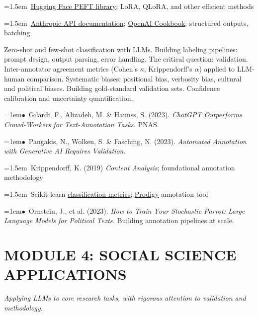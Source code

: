 \documentclass[11pt, a4paper]{article}
\newcommand{\topichead}[1]{%
  \vspace{0.8em}{\large\sffamily\bfseries\textcolor{accent}{#1}}\par\vspace{0.3em}
}
\newcommand{\seclabel}[1]{%
  \vspace{0.5em}{\normalsize\sffamily\bfseries\textcolor{accent}{#1}}\par\vspace{0.2em}
}
\newcommand{\refpaper}[1]{%
  \par\hangindent=1em\hangafter=1\noindent\textcolor{accent}{\small$\bullet$}~{\small #1}\par
}
\newcommand{\resource}[1]{%
  \par\hangindent=1.5em\hangafter=1\noindent\hspace{0.5em}{\small\textcolor{accent}{\guilsinglright}}~{\small #1}\par
}
\begin{document}
\seclabel{Further Resources}

\resource{\href{https://github.com/huggingface/peft}{Hugging Face PEFT library}; LoRA, QLoRA, and other efficient methods}

\resource{\href{https://docs.anthropic.com}{Anthropic API documentation}; \href{https://cookbook.openai.com}{OpenAI Cookbook}; structured outputs, batching}

\vspace{1em}

\topichead{Text Classification \& Validation}

\seclabel{Core Concepts}

Zero-shot and few-shot classification with LLMs. Building labeling pipelines: prompt design, output parsing, error handling. The critical question: validation. Inter-annotator agreement metrics (Cohen's $\kappa$, Krippendorff's $\alpha$) applied to LLM-human comparison. Systematic biases: positional bias, verbosity bias, cultural and political biases. Building gold-standard validation sets. Confidence calibration and uncertainty quantification.

\seclabel{Core Readings}

\refpaper{Gilardi, F., Alizadeh, M. \& Haunss, S. (2023). \textit{ChatGPT Outperforms Crowd-Workers for Text-Annotation Tasks.} PNAS.}

\refpaper{Pangakis, N., Wolken, S. \& Fasching, N. (2023). \textit{Automated Annotation with Generative AI Requires Validation.}}

\seclabel{Further Resources}

\resource{Krippendorff, K. (2019) \textit{Content Analysis}; foundational annotation methodology}

\resource{Scikit-learn \href{https://scikit-learn.org/stable/modules/model_evaluation.html}{classification metrics}; \href{https://prodi.gy}{Prodigy} annotation tool}

\seclabel{Social Science Application}

\refpaper{Ornstein, J., et al. (2023). \textit{How to Train Your Stochastic Parrot: Large Language Models for Political Texts.} Building annotation pipelines at scale.}


\section{MODULE 4: SOCIAL SCIENCE APPLICATIONS}
{\textit{\textcolor{muted}{Applying LLMs to core research tasks, with rigorous attention to validation and methodology.}}}
\end{document}
